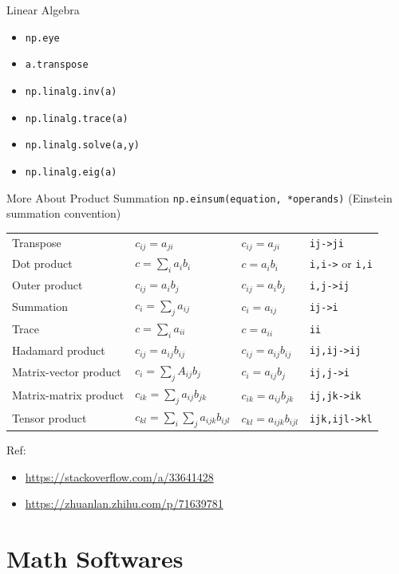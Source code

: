 \documentclass{../TexTemplate/myslide}
\begin{document}
\begin{frame}[fragile]{Linear Algebra}
\begin{itemize}
	\item \verb'np.eye'
	\item \verb'a.transpose'
	\item \verb'np.linalg.inv(a)'
	\item \verb'np.linalg.trace(a)'
	\item \verb'np.linalg.solve(a,y)'
	\item \verb'np.linalg.eig(a)'
\end{itemize}
\end{frame}

\begin{frame}[fragile]{More About Product Summation}
\verb'np.einsum(equation, *operands)' (Einstein summation convention)
\small
\begin{center}
\begin{tabular}{llll}\hline\hline
Transpose & $c_{ij}=a_{ji}$ & $c_{ij}=a_{ji}$ & \verb'ij->ji'\\
Dot product & $c=\sum_i a_ib_i$ & $c=a_ib_i$ & \verb'i,i->' or \verb'i,i'\\
Outer product & $c_{ij}=a_ib_j$ & $c_{ij}=a_ib_j$ & \verb'i,j->ij'\\
Summation & $c_i=\sum_j a_{ij}$ & $c_i=a_{ij}$ & \verb'ij->i'\\
Trace & $c=\sum_i a_{ii}$ & $c=a_{ii}$ & \verb'ii'\\
Hadamard product & $c_{ij}=a_{ij}b_{ij}$ & $c_{ij}=a_{ij}b_{ij}$ & \verb'ij,ij->ij'\\
Matrix-vector product & $c_i=\sum_jA_{ij}b_j$ & $c_i=a_{ij}b_j$ & \verb'ij,j->i'\\
Matrix-matrix product & $c_{ik}=\sum_ja_{ij}b_{jk}$ & $c_{ik}=a_{ij}b_{jk}$ & \verb'ij,jk->ik'\\
Tensor product & $c_{kl}=\sum_i\sum_ja_{ijk}b_{ijl}$ & $c_{kl}=a_{ijk}b_{ijl}$ & \verb'ijk,ijl->kl'\\
\hline
\end{tabular}
\end{center}
Ref:
\begin{itemize}
	\item \url{https://stackoverflow.com/a/33641428}
	\item \url{https://zhuanlan.zhihu.com/p/71639781}
\end{itemize}
\end{frame}

\section{Math Softwares}
\begin{frame}
\sectionpage
\end{frame}
\end{document}
